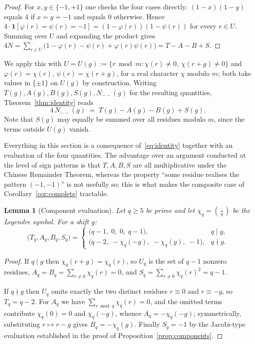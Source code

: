 \documentclass[11pt,reqno]{amsart}
\theoremstyle{plain}
\newtheorem{lemma}[theorem]{Lemma}
\theoremstyle{definition}
\newcommand{\Leg}[2]{\left(\frac{#1}{#2}\right)}
\begin{document}
\begin{proof}
For $x, y \in \{-1, +1\}$ one checks the four cases directly:
$(1-x)(1-y)$ equals $4$ if $x = y = -1$ and equals $0$ otherwise. Hence
$4 \cdot \mathbf{1}[\varphi(r) = \psi(r) = -1] = (1 - \varphi(r))(1 - \psi(r))$
for every $r \in U$. Summing over $U$ and expanding the product gives
$4N = \sum_{r \in U} \bigl(1 - \varphi(r) - \psi(r) + \varphi(r)\psi(r)\bigr)
    = T - A - B + S$.
\end{proof}

We apply this with $U = U(g) := \{ r \bmod m : \chi(r) \neq 0,\ \chi(r+g) \neq
0 \}$ and $\varphi(r) = \chi(r)$, $\psi(r) = \chi(r+g)$, for a real character
$\chi$ modulo $m$; both take values in $\{\pm 1\}$ on $U(g)$ by construction.
Writing $T(g), A(g), B(g), S(g), N_{--}(g)$ for the resulting quantities,
Theorem~\ref{thm:identity} reads
\begin{equation}
\label{eq:identity}
  4\, N_{--}(g) \;=\; T(g) - A(g) - B(g) + S(g).
\end{equation}
Note that $S(g)$ may equally be summed over all residues modulo $m$, since the
terms outside $U(g)$ vanish.

Everything in this section is a consequence of~\eqref{eq:identity} together
with an evaluation of the four quantities. The advantage over an argument
conducted at the level of sign patterns is that $T, A, B, S$ are all
multiplicative under the Chinese Remainder Theorem, whereas the property
``some residue realises the pattern $(-1,-1)$'' is not usefully so; this is
what makes the composite case of Corollary~\ref{cor:complete} tractable.

\begin{lemma}[Component evaluation]
\label{lem:components}
Let $q \ge 5$ be prime and let $\chi_q = \Leg{\cdot}{q}$ be the Legendre
symbol. For a shift $g$:
\[
  \bigl(T_q, A_q, B_q, S_q\bigr) =
  \begin{cases}
    \bigl(q-1,\; 0,\; 0,\; q-1\bigr), & q \mid g,\\[2pt]
    \bigl(q-2,\; -\chi_q(-g),\; -\chi_q(g),\; -1\bigr), & q \nmid g.
  \end{cases}
\]
\end{lemma}

\begin{proof}
If $q \mid g$ then $\chi_q(r+g) = \chi_q(r)$, so $U_q$ is the set of $q-1$
nonzero residues, $A_q = B_q = \sum_{r \neq 0} \chi_q(r) = 0$, and
$S_q = \sum_{r \neq 0} \chi_q(r)^2 = q-1$.

If $q \nmid g$ then $U_q$ omits exactly the two distinct residues $r \equiv 0$
and $r \equiv -g$, so $T_q = q - 2$. For $A_q$ we have
$\sum_{r \bmod q} \chi_q(r) = 0$, and the omitted terms contribute
$\chi_q(0) = 0$ and $\chi_q(-g)$, whence $A_q = -\chi_q(-g)$; symmetrically,
substituting $r \mapsto r - g$ gives $B_q = -\chi_q(g)$. Finally $S_q = -1$
by the Jacobi-type evaluation established in the proof of
Proposition~\ref{prop:components}.
\end{proof}
\end{document}
